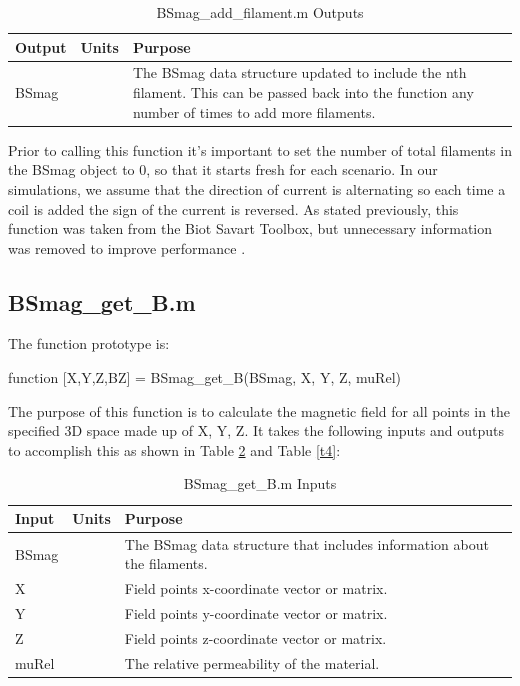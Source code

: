 \begin{table}[H]
    \caption[BSmag\_add\_filament.m Outputs]{BSmag\_add\_filament.m Outputs}
    \begin{center}
    \begin{tabular}{| p{} | p{} | p{} |}
    \hline
    Output & Units & Purpose \\
    \hline \hline
    BSmag & & The BSmag data structure updated to include the nth filament. This can be passed back into the function any number of times to add more filaments. \\
    \hline
    \end{tabular}
    \end{center}
    \label{t2}
\end{table}

Prior to calling this function it’s important to set the number of total filaments in the BSmag object to 0, 
so that it starts fresh for each scenario. In our simulations, we assume that the direction of current is 
alternating so each time a coil is added the sign of the current is reversed. As stated previously, 
this function was taken from the Biot Savart Toolbox, but unnecessary information was removed to improve 
performance \cite{lqueval_lquevalbsmag_2020}.

\subsection{BSmag\_get\_B.m}
The function prototype is:
\begin{center}
    function [X,Y,Z,BZ] = BSmag\_get\_B(BSmag, X, Y, Z, muRel)
\end{center}
The purpose of this function is to calculate the magnetic field 
for all points in the specified 3D space made up of X, Y, Z. It takes the following inputs and outputs to accomplish 
this as shown in Table \ref{t3} and Table \ref{t4}:

\begin{table}[H]
    \caption[BSmag\_get\_B.m Inputs]{BSmag\_get\_B.m Inputs}
    \begin{center}
    \begin{tabular}{| p{} | p{} | p{} |}
    \hline
    Input & Units & Purpose \\
    \hline \hline
    BSmag & & The BSmag data structure that includes information about the filaments. \\
    X & & Field points x-coordinate vector or matrix. \\
    Y & & Field points y-coordinate vector or matrix. \\
    Z & & Field points z-coordinate vector or matrix. \\
    muRel & & The relative permeability of the material. \\
    \hline
    \end{tabular}
    \end{center}
    \label{t3}
\end{table}


